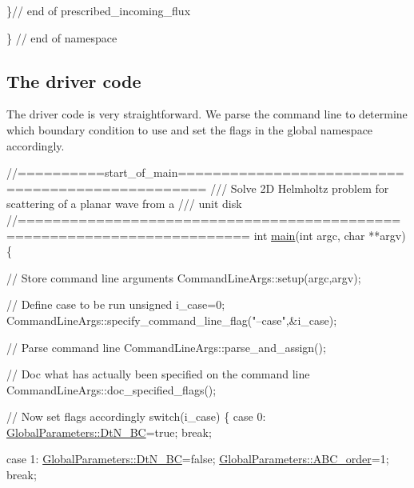 \begin{DoxyCodeInclude}
 \}\textcolor{comment}{// end of prescribed\_incoming\_flux }

\} \textcolor{comment}{// end of namespace}

\end{DoxyCodeInclude}




 

\hypertarget{index_main}{}\subsection{The driver code}\label{index_main}
The driver code is very straightforward. We parse the command line to determine which boundary condition to use and set the flags in the global namespace accordingly.

 
\begin{DoxyCodeInclude}
\textcolor{comment}{//==========start\_of\_main=================================================}
\textcolor{comment}{/// Solve 2D Helmholtz problem for scattering of a planar wave from a }
\textcolor{comment}{}\textcolor{comment}{/// unit disk }
\textcolor{comment}{}\textcolor{comment}{//========================================================================}
\textcolor{keywordtype}{int} \hyperlink{barrel_8cc_ae66f6b31b5ad750f1fe042a706a4e3d4}{main}(\textcolor{keywordtype}{int} argc, \textcolor{keywordtype}{char} **argv)
\{
 
 \textcolor{comment}{// Store command line arguments}
 CommandLineArgs::setup(argc,argv);

 \textcolor{comment}{// Define case to be run}
 \textcolor{keywordtype}{unsigned} i\_case=0;
 CommandLineArgs::specify\_command\_line\_flag(\textcolor{stringliteral}{"--case"},&i\_case);
 
 \textcolor{comment}{// Parse command line}
 CommandLineArgs::parse\_and\_assign(); 
 
 \textcolor{comment}{// Doc what has actually been specified on the command line}
 CommandLineArgs::doc\_specified\_flags();

 \textcolor{comment}{// Now set flags accordingly}
 \textcolor{keywordflow}{switch}(i\_case)
  \{
  \textcolor{keywordflow}{case} 0:
   \hyperlink{namespaceGlobalParameters_a6e2bba1769e86a5d3db88e2c7062bc63}{GlobalParameters::DtN\_BC}=\textcolor{keyword}{true};
   \textcolor{keywordflow}{break};
   
  \textcolor{keywordflow}{case} 1:
   \hyperlink{namespaceGlobalParameters_a6e2bba1769e86a5d3db88e2c7062bc63}{GlobalParameters::DtN\_BC}=\textcolor{keyword}{false};
   \hyperlink{namespaceGlobalParameters_a552eed3548a269715a95161ad3c4b96a}{GlobalParameters::ABC\_order}=1;
   \textcolor{keywordflow}{break};


\end{DoxyCodeInclude}
